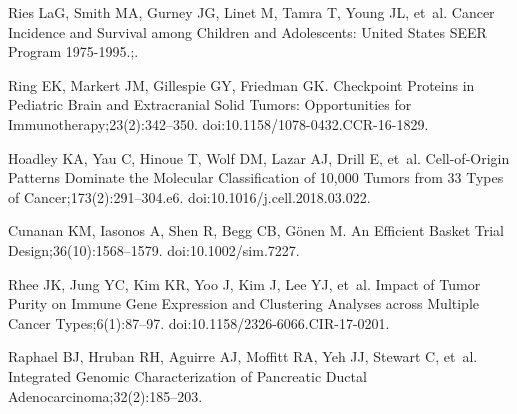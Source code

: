 \documentclass[10pt,letterpaper]{article}
\begin{document}
\begin{thebibliography}{10}
	Ries LaG, Smith MA, Gurney JG, Linet M, Tamra T, Young JL, et~al.
	\newblock Cancer Incidence and Survival among Children and Adolescents:
	{{United States SEER Program}} 1975-1995.;.
	
	Ring EK, Markert JM, Gillespie GY, Friedman GK.
	\newblock Checkpoint {{Proteins}} in {{Pediatric Brain}} and {{Extracranial
			Solid Tumors}}: {{Opportunities}} for {{Immunotherapy}};23(2):342--350.
	\newblock doi:{10.1158/1078-0432.CCR-16-1829}.
	
	Hoadley KA, Yau C, Hinoue T, Wolf DM, Lazar AJ, Drill E, et~al.
	\newblock Cell-of-{{Origin Patterns Dominate}} the {{Molecular Classification}}
	of 10,000 {{Tumors}} from 33 {{Types}} of {{Cancer}};173(2):291--304.e6.
	\newblock doi:{10.1016/j.cell.2018.03.022}.
	
	Cunanan KM, Iasonos A, Shen R, Begg CB, Gönen M.
	\newblock An {{Efficient Basket Trial Design}};36(10):1568--1579.
	\newblock doi:{10.1002/sim.7227}.
	
	Rhee JK, Jung YC, Kim KR, Yoo J, Kim J, Lee YJ, et~al.
	\newblock Impact of {{Tumor Purity}} on {{Immune Gene Expression}} and
	{{Clustering Analyses}} across {{Multiple Cancer Types}};6(1):87--97.
	\newblock doi:{10.1158/2326-6066.CIR-17-0201}.
	
	Raphael BJ, Hruban RH, Aguirre AJ, Moffitt RA, Yeh JJ, Stewart C, et~al.
	\newblock Integrated Genomic Characterization of Pancreatic Ductal
	Adenocarcinoma;32(2):185--203.
	
\end{thebibliography}
\end{document}
